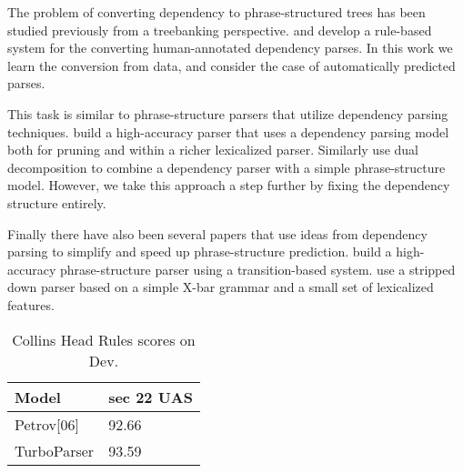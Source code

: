\documentclass[11pt,letterpaper]{article}
\begin{document}
The problem of converting dependency to phrase-structured trees has
been studied previously from a treebanking perspective.
 and  develop a
rule-based system for the converting human-annotated dependency
parses. In this work we learn the conversion from data, and consider
the case of automatically predicted parses.

This task is similar to phrase-structure parsers that utilize
dependency parsing techniques.  build a
high-accuracy parser that uses a dependency parsing model both for
pruning and within a richer lexicalized parser. Similarly
 use dual decomposition to combine a dependency
parser with a simple phrase-structure model. However, we take this
approach a step further by fixing the dependency structure
entirely.


Finally there have also been several papers that use ideas from
dependency parsing to simplify and speed up phrase-structure prediction.
 build a high-accuracy phrase-structure parser
using a transition-based system.  use a stripped
down parser based on a simple X-bar grammar and a small set of lexicalized features.









\begin{table}
  \centering
  \begin{tabular}{|l|l|}
    \hline
    Model & sec 22 UAS  \\
    \hline

    \hline
    Petrov[06] & 92.66   \\
    TurboParser & 93.59  \\
    \hline
  \end{tabular}
  \caption{Collins Head Rules scores on Dev.  }
  \label{fig:depcomp}
\end{table}
\end{document}
